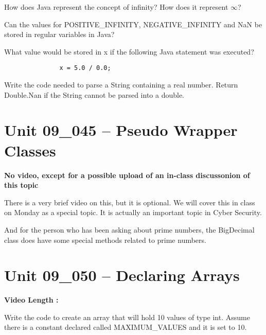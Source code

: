 \documentclass[letterpaper,12pt]{exam}
\newcommand{\unit}{Unit 09}
\begin{document}
\begin{questions}
\begin{samepage}
    \question How does Java represent the concept of infinity?  How does it represent $\infty$?
    \vspace{5mm}
\end{samepage}

\begin{samepage}
    \question Can the values for POSITIVE\_INFINITY, NEGATIVE\_INFINITY and NaN be stored in regular variables in Java?
    \vspace{5mm}
\end{samepage}

\begin{samepage}
    \question What value would be stored in x if the following Java statement was executed?
    \begin{verbatim}
               x = 5.0 / 0.0;
    \end{verbatim}
    \vspace{5mm}
\end{samepage}


\begin{samepage}
    \question Write the code needed to parse a String containing a real number.  Return Double.Nan if the String cannot be parsed into a double.
    \vspace{5mm}
\end{samepage}

\section*{\unit\_045 -- Pseudo Wrapper Classes} 
\par{\selectfont\textbf{No video, except for a possible upload of an in-class discussonion of this topic}}

There is a very brief video on this, but it is optional.  We will cover this in class on Monday as a special topic.  It is actually an important topic in Cyber Security.

And for the person who has been asking about prime numbers, the BigDecimal class does have some special methods related to prime numbers.

\section*{\unit\_050 -- Declaring Arrays} 
\par{\selectfont\textbf{Video Length :}}

\begin{samepage}
    \question Write the code to create an array that will hold 10 values of type int.  Assume there is a constant declared called MAXIMUM\_VALUES and it is set to 10.
    \vspace{5mm}
\end{samepage}


\end{questions}
\end{document}
